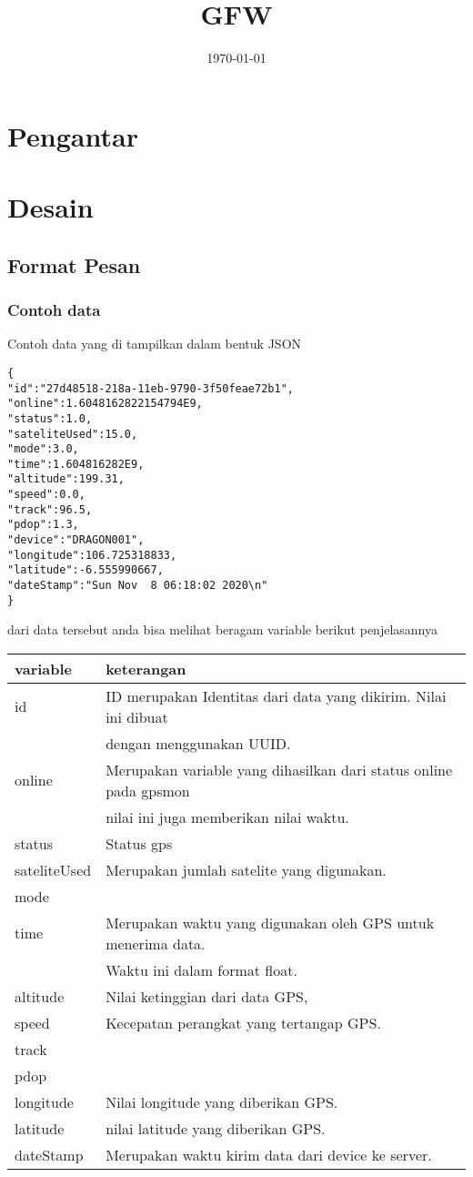 \documentclass[11pt]{article}
\date{\today}
\title{GFW}
\begin{document}
\maketitle
\tableofcontents



\section{Pengantar}
\label{sec:orgb905b9a}
\section{Desain}
\label{sec:org0922b7e}

\subsection{Format Pesan}
\label{sec:orgb47b16b}
\subsubsection{Contoh data}
\label{sec:orgad2ce8a}
Contoh data yang di tampilkan dalam bentuk JSON
\begin{verbatim}
{ 
"id":"27d48518-218a-11eb-9790-3f50feae72b1",
"online":1.6048162822154794E9,
"status":1.0,
"sateliteUsed":15.0,
"mode":3.0,
"time":1.604816282E9,
"altitude":199.31,
"speed":0.0,
"track":96.5,
"pdop":1.3,
"device":"DRAGON001",
"longitude":106.725318833,
"latitude":-6.555990667,
"dateStamp":"Sun Nov  8 06:18:02 2020\n"
}
\end{verbatim}
dari data tersebut anda bisa melihat beragam variable berikut penjelasannya
\begin{center}
\begin{tabular}{ll}
\hline
variable & keterangan\\
\hline
id & ID merupakan Identitas dari data yang dikirim. Nilai ini dibuat\\
 & dengan menggunakan UUID.\\
online & Merupakan variable yang dihasilkan dari status online pada gpsmon\\
 & nilai ini juga memberikan nilai waktu.\\
status & Status gps\\
sateliteUsed & Merupakan jumlah satelite yang digunakan.\\
mode & \\
time & Merupakan waktu yang digunakan oleh GPS untuk menerima data.\\
 & Waktu ini dalam format float.\\
altitude & Nilai ketinggian dari data GPS,\\
speed & Kecepatan perangkat yang tertangap GPS.\\
track & \\
pdop & \\
longitude & Nilai longitude yang diberikan GPS.\\
latitude & nilai latitude yang diberikan GPS.\\
dateStamp & Merupakan waktu kirim data dari device ke server.\\
\hline
\end{tabular}
\end{center}
\end{document}
